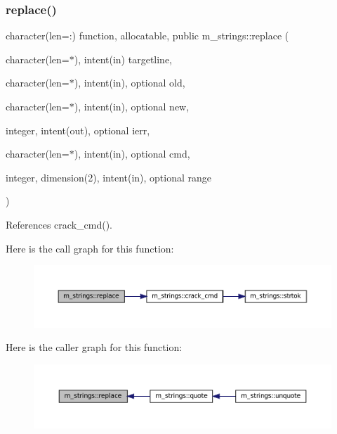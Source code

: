 \mbox{\label{namespacem__strings_ab5af73797bb08e7f654d39c9e8984ffe}} 
\subsubsection{\texorpdfstring{replace()}{replace()}}
{\footnotesize\ttfamily character(len=\+:) function, allocatable, public m\+\_\+strings\+::replace (\begin{DoxyParamCaption}\item[{character(len=$\ast$), intent(in)}]{targetline,  }\item[{character(len=$\ast$), intent(in), optional}]{old,  }\item[{character(len=$\ast$), intent(in), optional}]{new,  }\item[{integer, intent(out), optional}]{ierr,  }\item[{character(len=$\ast$), intent(in), optional}]{cmd,  }\item[{integer, dimension(2), intent(in), optional}]{range }\end{DoxyParamCaption})}



References crack\+\_\+cmd().

Here is the call graph for this function\+:\nopagebreak
\begin{figure}[H]
\begin{center}
\leavevmode
\includegraphics[width=350pt]{namespacem__strings_ab5af73797bb08e7f654d39c9e8984ffe_cgraph}
\end{center}
\end{figure}
Here is the caller graph for this function\+:\nopagebreak
\begin{figure}[H]
\begin{center}
\leavevmode
\includegraphics[width=350pt]{namespacem__strings_ab5af73797bb08e7f654d39c9e8984ffe_icgraph}
\end{center}
\end{figure}
\mbox{\label{namespacem__strings_ab3e5e7af9e9594fdb544f82736a26f17}} 

